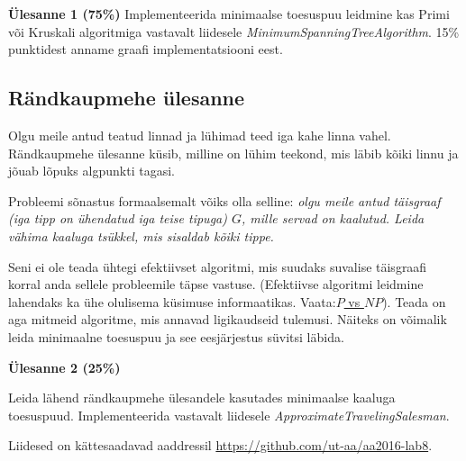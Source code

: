\documentclass[a4paper]{article}
\begin{document}
\begin{problem}

\textbf{Ülesanne 1 (75\%)}
Implementeerida minimaalse toesuspuu leidmine kas Primi või Kruskali algoritmiga vastavalt liidesele \textit{MinimumSpanningTreeAlgorithm}.
15\% punktidest anname graafi implementatsiooni eest. 
\end{problem}

{\center
\subsection*{Rändkaupmehe ülesanne}
}

Olgu meile antud teatud linnad ja lühimad teed iga kahe linna vahel. Rändkaupmehe ülesanne küsib, milline on lühim teekond, mis läbib kõiki linnu ja jõuab lõpuks algpunkti tagasi.

Probleemi sõnastus formaalsemalt võiks olla selline: \textit{olgu meile antud täisgraaf (iga tipp on ühendatud iga teise tipuga) $G$, mille servad on kaalutud. Leida vähima kaaluga tsükkel, mis sisaldab kõiki tippe.}

Seni ei ole teada ühtegi efektiivset algoritmi, mis suudaks suvalise täisgraafi korral anda sellele probleemile täpse vastuse. (Efektiivse algoritmi leidmine lahendaks ka ühe olulisema küsimuse informaatikas. Vaata:\newpage \href{https://en.wikipedia.org/wiki/P_versus_NP_problem}{$P$ vs $NP$}). Teada on aga mitmeid algoritme, mis annavad ligikaudseid tulemusi. Näiteks on võimalik leida minimaalne toesuspuu ja see eesjärjestus süvitsi läbida.

\begin{problem}
\textbf{Ülesanne 2 (25\%)}

Leida lähend rändkaupmehe ülesandele kasutades minimaalse kaaluga toesuspuud. Implementeerida vastavalt liidesele \textit{ApproximateTravelingSalesman}.
\end{problem}

Liidesed on kättesaadavad aaddressil \url{https://github.com/ut-aa/aa2016-lab8}.
\end{document}

